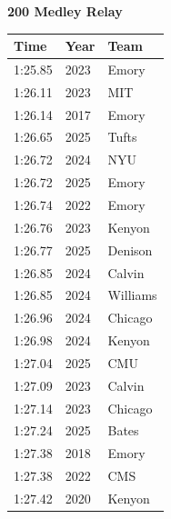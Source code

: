 \noindent\begin{minipage}[t]{0.98\textwidth}
\centering
\textbf{\textcolor{teamprimary}{200 Medley Relay}}\par
\vspace{0.5em}
\centering
\small
\renewcommand{\arraystretch}{1.0}
\setlength{\tabcolsep}{4pt}
\begin{tabular}{@{}p{4.5cm}p{2.5cm}p{4.5cm}@{}}
\toprule
\textbf{Time} & \textbf{Year} & \textbf{Team} \\
\midrule
1:25.85 & 2023 & Emory \\
1:26.11 & 2023 & MIT \\
1:26.14 & 2017 & Emory \\
1:26.65 & 2025 & Tufts \\
1:26.72 & 2024 & NYU \\
1:26.72 & 2025 & Emory \\
1:26.74 & 2022 & Emory \\
1:26.76 & 2023 & Kenyon \\
1:26.77 & 2025 & Denison \\
1:26.85 & 2024 & Calvin \\
1:26.85 & 2024 & Williams \\
1:26.96 & 2024 & Chicago \\
1:26.98 & 2024 & Kenyon \\
1:27.04 & 2025 & CMU \\
1:27.09 & 2023 & Calvin \\
1:27.14 & 2023 & Chicago \\
1:27.24 & 2025 & Bates \\
1:27.38 & 2018 & Emory \\
1:27.38 & 2022 & CMS \\
1:27.42 & 2020 & Kenyon \\
\bottomrule
\end{tabular}
\end{minipage}
\vspace{1.2em}
